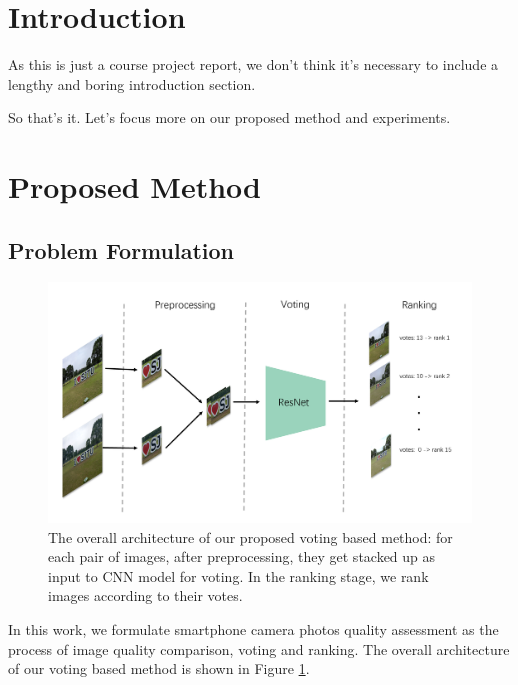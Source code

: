 \documentclass[journal]{IEEEtran}
\begin{document}
\IEEEpeerreviewmaketitle

\section{Introduction}

As this is just a course project report, we don't think it's necessary to include a lengthy and boring introduction section. 

So that's it. Let's focus more on our proposed method and experiments.

\section{Proposed Method}

\subsection{Problem Formulation}
\begin{figure}
    \centering
    \includegraphics[width=\textwidth]{overall.png}
    \caption{The overall architecture of our proposed voting based method: for each pair of images, after preprocessing, they get stacked up as input to CNN model for voting. In the ranking stage, we rank images according to their votes.}
    \label{fig:architecture}
\end{figure}
In this work, we formulate smartphone camera photos quality assessment as the process of image quality comparison, voting and ranking. The overall architecture of our voting based method is shown in Figure \ref{fig:architecture}.
\end{document}
